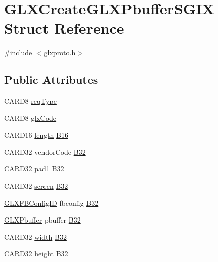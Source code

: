 \hypertarget{struct_g_l_x_create_g_l_x_pbuffer_s_g_i_x}{}\section{G\+L\+X\+Create\+G\+L\+X\+Pbuffer\+S\+G\+IX Struct Reference}
\label{struct_g_l_x_create_g_l_x_pbuffer_s_g_i_x}


{\ttfamily \#include $<$glxproto.\+h$>$}

\subsection*{Public Attributes}
\begin{DoxyCompactItemize}
\item 
C\+A\+R\+D8 \hyperlink{struct_g_l_x_create_g_l_x_pbuffer_s_g_i_x_a5136f7a5e8913ac2cd4c1c8cf42aa65d}{req\+Type}
\item 
C\+A\+R\+D8 \hyperlink{struct_g_l_x_create_g_l_x_pbuffer_s_g_i_x_af059c40c7704c0c5e0fee2edbc5c31de}{glx\+Code}
\item 
C\+A\+R\+D16 \hyperlink{glcorearb_8h_ab9c919755bde3b34349e23a32b4e0fa7}{length} \hyperlink{struct_g_l_x_create_g_l_x_pbuffer_s_g_i_x_a82011e190802de8815954644bcb8c956}{B16}
\item 
C\+A\+R\+D32 vendor\+Code \hyperlink{struct_g_l_x_create_g_l_x_pbuffer_s_g_i_x_a571668d02891aa300f2f887fe564db51}{B32}
\item 
C\+A\+R\+D32 pad1 \hyperlink{struct_g_l_x_create_g_l_x_pbuffer_s_g_i_x_ac8efa995a4d4cbc10001edc235b089de}{B32}
\item 
C\+A\+R\+D32 \hyperlink{cad_8h_ae04e09e4e3831bfc1632c509ae37dcec}{screen} \hyperlink{struct_g_l_x_create_g_l_x_pbuffer_s_g_i_x_a02af29b94a86a1442c2dc30b3df713c6}{B32}
\item 
\hyperlink{glx_8h_a38e78acefebf732d1a0da441ad1de05f}{G\+L\+X\+F\+B\+Config\+ID} fbconfig \hyperlink{struct_g_l_x_create_g_l_x_pbuffer_s_g_i_x_a3436f85f9414f823bb655776cfddd622}{B32}
\item 
\hyperlink{glx_8h_a0e12899d42d3570d659900a17247cb71}{G\+L\+X\+Pbuffer} pbuffer \hyperlink{struct_g_l_x_create_g_l_x_pbuffer_s_g_i_x_a93b26243f7ebca209222a83276a664c2}{B32}
\item 
C\+A\+R\+D32 \hyperlink{gl_8h_a9a82cf3caff84cabc4598e2619faac17}{width} \hyperlink{struct_g_l_x_create_g_l_x_pbuffer_s_g_i_x_a6912fda088671c0a96739e78932b5ac8}{B32}
\item 
C\+A\+R\+D32 \hyperlink{gl_8h_aa352f2804b9902ac30769c00dde75d5f}{height} \hyperlink{struct_g_l_x_create_g_l_x_pbuffer_s_g_i_x_a803cf2eee08939d7b2c7dc7b601e8422}{B32}
\end{DoxyCompactItemize}


